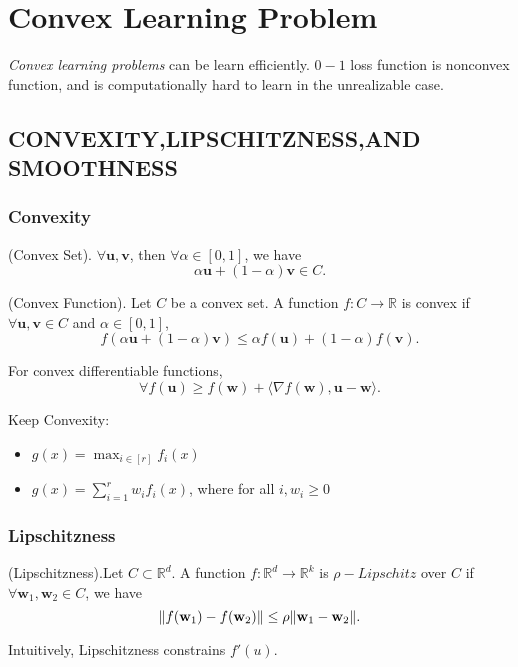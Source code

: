 
\section{Convex Learning Problem}

\emph{Convex learning problems} can be learn efficiently.
$ 0-1 $ loss function is nonconvex function, and is computationally hard to learn in the unrealizable case.

\subsection{CONVEXITY,LIPSCHITZNESS,AND SMOOTHNESS}

\subsubsection{Convexity}

\begin{defn}
	(Convex Set). $ \forall \mathbf{u},\mathbf{v}$, then $ \forall \alpha \in [0,1] $, 
	we have  
	\[ \alpha \mathbf{u} + (1-\alpha) \mathbf{v} \in C.\]
\end{defn}

\begin{defn}
	(Convex Function). Let $ C $ be a convex set.
	A function $ f:C \rightarrow \mathbb{R} $ is convex if 
	$ \forall \mathbf{u},\mathbf{v} \in C $ and $ \alpha \in [0,1] $,
	\[ f(\alpha\mathbf{u}+(1-\alpha)\mathbf{v}) \le \alpha f(\mathbf{u}) + (1-\alpha) f(\mathbf{v}).\]
\end{defn}

For convex differentiable functions,
\[ \forall f(\mathbf{u}) \ge f(\mathbf{w}) + \langle \nabla f(\mathbf{w}),\mathbf{u}-\mathbf{w} \rangle.\]

Keep Convexity:
\begin{itemize}
	\item $ g(x) = \max_{ i \in [r] } f_i(x) $ 
	\item $ g(x) = \sum^r_{i=1} w_i f_i(x) $, where for all $ i, w_i \ge 0 $ 
\end{itemize}

\subsubsection{Lipschitzness}

\begin{defn}
	(Lipschitzness).Let $ C \subset \mathbb{R}^d $. A function $ f:\mathbb{R}^d \rightarrow \mathbb{R}^k $ is $ \rho-Lipschitz $ 
	over $ C $ if $ \forall \mathbf{w}_1, \mathbf{w}_2 \in C $, we have
	\[ \Arrowvert f(\mathbf{w}_1) - f(\mathbf{w}_2) \Arrowvert \le \rho \Arrowvert \mathbf{w}_1 - \mathbf{w}_2 \Arrowvert.\]
\end{defn}
Intuitively, Lipschitzness constrains $ f'(u) $. 

